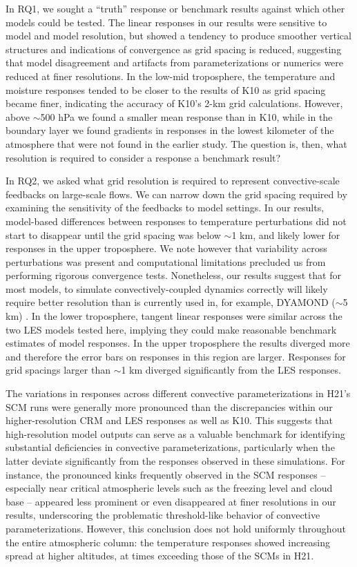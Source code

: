 \documentclass[draft]{agujournal2019}
\begin{document}
In RQ1, we sought a ``truth'' response or benchmark results against which other
models could be tested. The linear responses in our results were sensitive to
model and model resolution, but showed a tendency to produce smoother vertical
structures and indications of convergence as grid spacing is reduced, suggesting
that model disagreement and artifacts from parameterizations or numerics were
reduced at finer resolutions. In the low-mid troposphere, the temperature and
moisture responses tended to be closer to the results of K10 as grid spacing
became finer, indicating the accuracy of K10's 2-km grid calculations. However,
above $\sim$500 hPa we found a smaller mean response than in K10, while in the
boundary layer we found gradients in responses in the lowest kilometer of the
atmosphere that were not found in the earlier study. The question is, then, what
resolution is required to consider a response a benchmark result?

In RQ2, we asked what grid resolution is required to represent convective-scale
feedbacks on large-scale flows. We can narrow down the grid spacing required by
examining the sensitivity of the feedbacks to model settings. In our results,
model-based differences between responses to temperature perturbations did not
start to disappear until the grid spacing was below $\sim$1 km, and likely lower
for responses in the upper troposphere. We note however that variability across
perturbations was present and computational limitations precluded us from
performing rigorous convergence tests. Nonetheless, our results suggest that for
most models, to simulate convectively-coupled dynamics correctly will likely
require better resolution than is currently used in, for example, DYAMOND
($\sim$5 km) \cite{Stevens_PEPS_2019}. In the lower troposphere, tangent linear
responses were similar across the two LES models tested here, implying they
could make reasonable benchmark estimates of model responses. In the upper
troposphere the results diverged more and therefore the error bars on responses
in this region are larger. Responses for grid spacings larger than $\sim$1 km
diverged significantly from the LES responses.

The variations in responses across different convective parameterizations in
H21's SCM runs were generally more pronounced than the discrepancies within our
higher-resolution CRM and LES responses as well as K10. This suggests that
high-resolution model outputs can serve as a valuable benchmark for identifying
substantial deficiencies in convective parameterizations, particularly when the
latter deviate significantly from the responses observed in these simulations.
For instance, the pronounced kinks frequently observed in the SCM responses --
especially near critical atmospheric levels such as the freezing level and cloud
base -- appeared less prominent or even disappeared at finer resolutions in our
results, underscoring the problematic threshold-like behavior of convective
parameterizations. However, this conclusion does not hold uniformly throughout
the entire atmospheric column: the temperature responses showed increasing
spread at higher altitudes, at times exceeding those of the SCMs in H21. 
\end{document}
